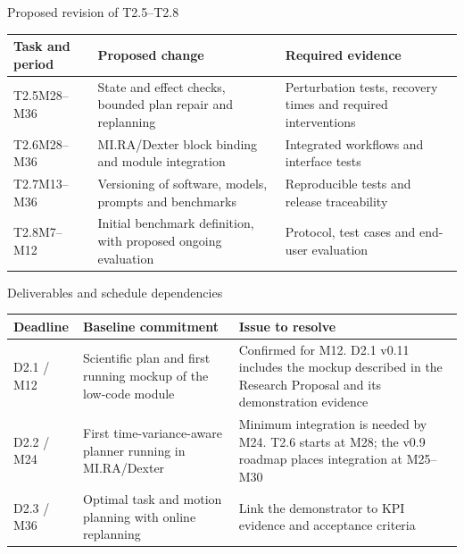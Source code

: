\documentclass[aspectratio=169,11pt]{beamer}
\begin{document}
\begin{frame}{Proposed revision of T2.5--T2.8}
\small\renewcommand{\arraystretch}{1.3}
\begin{tabularx}{\textwidth}{@{}p{}XX@{}}
\toprule
Task and period & Proposed change & Required evidence\\\midrule
T2.5\newline M28--M36 & State and effect checks, bounded plan repair and replanning & Perturbation tests, recovery times and required interventions\\
T2.6\newline M28--M36 & MI.RA/Dexter block binding and module integration & Integrated workflows and interface tests\\
T2.7\newline M13--M36 & Versioning of software, models, prompts and benchmarks & Reproducible tests and release traceability\\
T2.8\newline M7--M12 & Initial benchmark definition, with proposed ongoing evaluation & Protocol, test cases and end-user evaluation\\\bottomrule
\end{tabularx}
\end{frame}

\begin{frame}{Deliverables and schedule dependencies}
\small\renewcommand{\arraystretch}{1.35}
\begin{tabularx}{\textwidth}{@{}p{}XX@{}}
\toprule
Deadline & Baseline commitment & Issue to resolve\\\midrule
D2.1 / M12 & Scientific plan and first running mockup of the low-code module & Confirmed for M12. D2.1 v0.11 includes the mockup described in the Research Proposal and its demonstration evidence\\
D2.2 / M24 & First time-variance-aware planner running in MI.RA/Dexter & Minimum integration is needed by M24. T2.6 starts at M28; the v0.9 roadmap places integration at M25--M30\\
D2.3 / M36 & Optimal task and motion planning with online replanning & Link the demonstrator to KPI evidence and acceptance criteria\\\bottomrule
\end{tabularx}
\end{frame}
\end{document}

